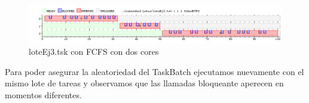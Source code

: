 \begin{figure}[H]
  \centering
    \includegraphics[width=1.1\textwidth]{imagenes/Ej3Experimento2.png}
  \caption{loteEj3.tsk con FCFS con dos cores}
\end{figure}

Para poder asegurar la aleatoriedad del TaskBatch ejecutamos nuevamente con el mismo lote de tareas y observamos que las llamadas bloqueante aperecen en momentos diferentes.